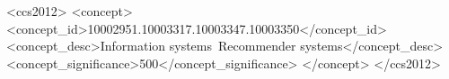 \documentclass[sigconf]{acmart}
\begin{document}
\begin{CCSXML}
<ccs2012>
   <concept>
       <concept_id>10002951.10003317.10003347.10003350</concept_id>
       <concept_desc>Information systems~Recommender systems</concept_desc>
       <concept_significance>500</concept_significance>
       </concept>
 </ccs2012>
\end{CCSXML}



\maketitle















\end{document}
